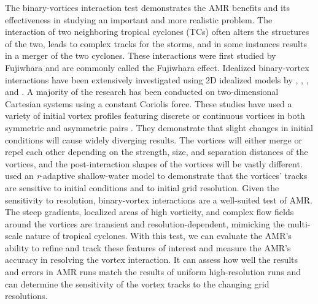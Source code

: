 The binary-vortices interaction
test demonstrates the AMR benefits and its
effectiveness in studying an important and more realistic problem.  The
interaction of two neighboring tropical cyclones (TCs) often alters the
structures of the two, leads to complex tracks for the storms, and in some instances
results in a merger of the two cyclones.  These
interactions were first studied by Fujiwhara \citep{fujiwhara1921natural}
and are commonly called the Fujiwhara effect.  Idealized binary-vortex
interactions have been extensively investigated using 2D idealized
models by
\cite{melander1988symmetric},
\cite{waugh1992efficiency},
\cite{Ritchie:1993eu},
\cite{prieto2003classification} and
\cite{Shin:2006kx}.  A majority of the research has been conducted on
two-dimensional Cartesian systems using a constant Coriolis force.
These studies have used a variety of initial vortex profiles featuring
discrete \citep{Ritchie:1993eu} or continuous \citep{bauer2014simulation}
vortices in both symmetric and asymmetric pairs \citep{dritschel1992quantification}.
They demonstrate that slight changes in initial conditions will cause
widely diverging results.  The vortices will either merge or repel each
other depending on the strength, size, and separation distances of the
vortices, and the post-interaction shapes of the vortices will be vastly
different.
\cite{bauer2014simulation} used an \emph{r}-adaptive shallow-water model to
demonstrate that the vortices' tracks are sensitive to initial
conditions and to initial grid resolution.  Given the sensitivity to
resolution, binary-vortex interactions are a well-suited test of AMR.
The steep gradients, localized areas of high vorticity, and complex flow
fields around the vortices are transient and resolution-dependent,
mimicking the multi-scale nature of tropical cyclones.  With this test, we
can evaluate the AMR's ability to refine and track these features of
interest and measure the AMR's accuracy in resolving the vortex
interaction.  It can assess how well the results and errors in AMR runs
match the results of uniform high-resolution runs and can determine the
sensitivity of the vortex tracks to the changing grid resolutions.


